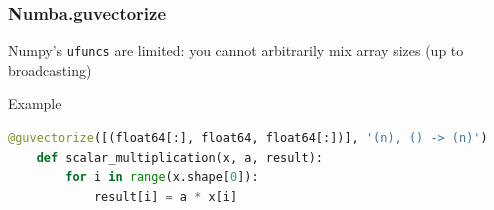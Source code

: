\documentclass[10pt, aspectratio=1610]{beamer}
\begin{document}
\begin{frame}[fragile]
  \frametitle{Numba.guvectorize}

  Numpy's \texttt{ufuncs} are limited: you cannot arbitrarily mix array sizes (up to broadcasting)

  \vfill

  Example
  \begin{lstlisting}[language=python]
    @guvectorize([(float64[:], float64, float64[:])], '(n), () -> (n)')
    def scalar_multiplication(x, a, result):
        for i in range(x.shape[0]):
            result[i] = a * x[i]
  \end{lstlisting}

  \vfill



\end{frame}
\end{document}
